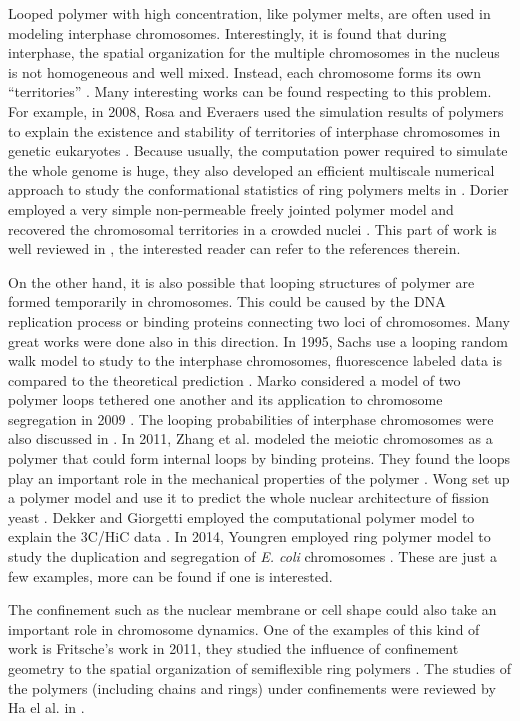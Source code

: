 Looped polymer with high concentration, like polymer melts, are often used in modeling interphase chromosomes. Interestingly, it is found that during interphase, the spatial organization for the multiple chromosomes in the nucleus is not homogeneous and well mixed. Instead, each chromosome forms its own ``territories'' \cite{Halverson2014}. Many interesting works can be found respecting to this problem. For example, in 2008, Rosa and Everaers used the simulation results of polymers to explain the existence and stability of territories of interphase chromosomes in genetic eukaryotes \cite{Rosa2008}. Because usually, the computation power required to simulate the whole genome is huge, they also developed an efficient multiscale numerical approach to study the conformational statistics of ring polymers melts in \cite{Rosa2014b}.  Dorier employed a very simple non-permeable freely jointed polymer model and recovered the chromosomal territories in a crowded nuclei \cite{Dorier2009}. This part of work is well reviewed in \cite{Halverson2014}, the interested reader can refer to the references therein. 

On the other hand, it is also possible that looping structures of polymer are formed temporarily in chromosomes. This could be caused by the DNA replication process or binding proteins connecting two loci of chromosomes. Many great works were done also in this direction. In 1995, Sachs use a looping random walk model to study to the interphase chromosomes, fluorescence labeled data is compared to the theoretical prediction \cite{Sachs1995}. Marko considered a model of two polymer loops tethered one another and its application to chromosome segregation in 2009 \cite{Marko2009}.  The looping probabilities of interphase chromosomes were also discussed in \cite{Rosa2010}.  In 2011, Zhang et al. modeled the meiotic chromosomes as a polymer that could form internal loops by binding proteins. They found the loops play an important role in the mechanical properties of the polymer \cite{Zhang2011a}. Wong set up a polymer model and use it to predict the whole nuclear architecture of fission yeast \cite{Wong2012}. Dekker and Giorgetti employed the computational polymer model to explain the 3C/HiC data \cite{Dekker2013,Giorgetti2014}. In 2014, Youngren employed ring polymer model to study the duplication and segregation of \emph{E. coli} chromosomes \cite{Youngren2014}.  These are just a few examples, more can be found if one is interested.

The confinement such as the nuclear membrane or cell shape could also take an important role in chromosome dynamics. One of the examples of this kind of work is Fritsche's work in 2011, they studied the influence of confinement geometry to the spatial organization of semiflexible ring polymers \cite{Fritsche2011}. The studies of the polymers (including chains and rings) under confinements were reviewed by Ha el al. in \cite{Ha2015}. 

